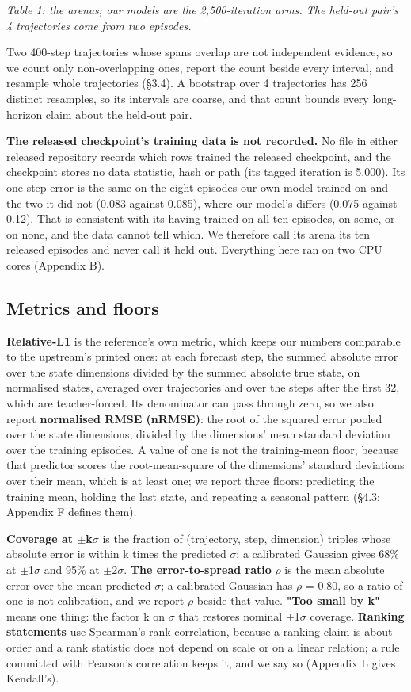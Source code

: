 \documentclass[10pt]{article}
\begin{document}
\emph{Table 1: the arenas; our models are the 2,500-iteration arms. The held-out pair's 4 trajectories come from two episodes.}

Two 400-step trajectories whose spans overlap are not independent evidence, so we count only non-overlapping ones, report the count beside every interval, and resample whole trajectories (\S{}3.4). A bootstrap over 4 trajectories has 256 distinct resamples, so its intervals are coarse, and that count bounds every long-horizon claim about the held-out pair.

\textbf{The released checkpoint's training data is not recorded.} No file in either released repository records which rows trained the released checkpoint, and the checkpoint stores no data statistic, hash or path (its tagged iteration is 5,000). Its one-step error is the same on the eight episodes our own model trained on and the two it did not (0.083 against 0.085), where our model's differs (0.075 against 0.12). That is consistent with its having trained on all ten episodes, on some, or on none, and the data cannot tell which. We therefore call its arena its ten released episodes and never call it held out. Everything here ran on two CPU cores (Appendix B).

\subsection{Metrics and floors}

\textbf{Relative-L1} is the reference's own metric, which keeps our numbers comparable to the upstream's printed ones: at each forecast step, the summed absolute error over the state dimensions divided by the summed absolute true state, on normalised states, averaged over trajectories and over the steps after the first 32, which are teacher-forced. Its denominator can pass through zero, so we also report \textbf{normalised RMSE (nRMSE)}: the root of the squared error pooled over the state dimensions, divided by the dimensions' mean standard deviation over the training episodes. A value of one is not the training-mean floor, because that predictor scores the root-mean-square of the dimensions' standard deviations over their mean, which is at least one; we report three floors: predicting the training mean, holding the last state, and repeating a seasonal pattern (\S{}4.3; Appendix F defines them).

\textbf{Coverage at $\pm$k$\sigma$} is the fraction of (trajectory, step, dimension) triples whose absolute error is within k times the predicted $\sigma$; a calibrated Gaussian gives 68\% at $\pm$1$\sigma$ and 95\% at $\pm$2$\sigma$. \textbf{The error-to-spread ratio} $\rho$ is the mean absolute error over the mean predicted $\sigma$; a calibrated Gaussian has $\rho$ = 0.80, so a ratio of one is not calibration, and we report $\rho$ beside that value. \textbf{"Too small by k"} means one thing: the factor k on $\sigma$ that restores nominal $\pm$1$\sigma$ coverage. \textbf{Ranking statements} use Spearman's rank correlation, because a ranking claim is about order and a rank statistic does not depend on scale or on a linear relation; a rule committed with Pearson's correlation keeps it, and we say so (Appendix L gives Kendall's).
\end{document}

